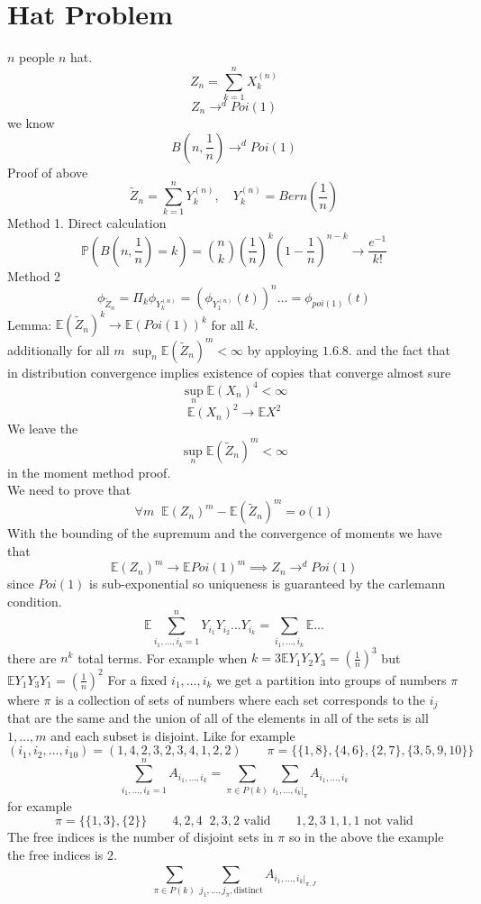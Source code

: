 \documentclass[11pt]{article}
\begin{document}
\section{Hat Problem}
$n$ people $n$ hat. 
\[
Z_n = \sum_{k=1}^{n} X_k^{(n)}
\] 
\[
Z_n \rightarrow^{d} Poi(1)
\] 
we know
\[
B(n, \frac{1}{n}) \rightarrow^{d} Poi(1)
\] 
Proof of above
\[
\tilde Z_n = \sum_{k=1}^{n} Y_k^{(n)} , \quad Y_k^{(n)} = Bern(\frac{1}{n})
\] 
Method 1. Direct calculation
\[
\mathbb{P}(B(n,\frac{1}{n}) = k) = \binom{n}{k} (\frac{1}{n})^{k}(1-\frac{1}{n})^{n-k} \rightarrow \frac{e^{-1}}{k!}
\] 
Method 2
\[
    \phi_{\tilde Z_n} = \Pi_k \phi_{Y_k^{(n)}} = (\phi_{Y_1^{(n)}}(t))^{n} \dots = \phi_{poi(1)}(t)
\] 
Lemma: $ \mathbb{E}(\tilde Z_n)^{k} \rightarrow \mathbb{E}(Poi(1))^{k}$ for all $k$.\\
additionally for all $m$  $\sup_n \mathbb{E}(\tilde Z_n)^{m} < \infty$ by apploying $1.6.8$. and the fact that in distribution convergence implies existence of copies that converge almost sure
\[
\sup_n \mathbb{E}(X_n)^{4} < \infty
\] 
\[
 \mathbb{E}(X_n)^2 \rightarrow \mathbb{E} X^2
\] 
We leave the 
\[
\sup_n \mathbb{E}( \tilde Z_n)^{m} < \infty
\] 
in the moment method proof.\\
We need to prove that 
\[
\forall m \;\; \mathbb{E}(Z_n)^{m} - \mathbb{E}(\tilde Z_n)^{m} = o(1)
\] 
With the bounding of the supremum and the convergence of moments we have that
\[
\mathbb{E}(Z_n)^{m} \rightarrow \mathbb{E} Poi(1)^{m} \implies Z_n \rightarrow^{d} Poi(1)
\] 
since $Poi(1)$ is sub-exponential so uniqueness is guaranteed by the carlemann condition.
 \[
     \mathbb{E}\sum_{i_1,\dots,i_k = 1}^{n} Y_{i_1} Y_{i_2}\dots Y_{i_k} = \sum_{i_1,\dots,i_k}^{} \mathbb{E} \dots
\] 
there are $n^{k}$ total terms. For example when $k = 3 \mathbb{E}Y_1Y_2Y_3 = (\frac{1}{n})^{3}$ but $ \mathbb{E}Y_1Y_3Y_1 = (\frac{1}{n})^{2}$ 
For a fixed $i_1,\dots,i_k$ we get a partition into groups of numbers $\pi$ where $\pi$ is a collection of sets of numbers where each set corresponds to the $i_j$ that are the same and the union of all of the elements in all of the sets is all  $1,\dots,m$ and each subset is disjoint.
Like for example
 \[
     (i_1,i_2,\dots,i_{10}) = (1,4,2,3,2,3,4,1,2,2) \qquad \pi = \{\{1,8\},\{4,6\},\{2,7\},\{3,5,9,10\}\}
\] 
\[
    \sum_{i_1,\dots,i_k=1}^{n} A_{i_1,\dots,i_k} = \sum_{\pi \in P(k)}^{} \sum_{i_1,\dots,i_k|_{\pi}}^{}A_{i_1,\dots,i_k}
\] 
for example
\[
    \pi = \{\{1,3\},\{2\}\} \qquad 4,2,4 \;\; 2,3,2 \text{ valid} \qquad 1,2,3 \; 1,1,1 \text{ not valid}
\] 
The free indices is the number of disjoint sets in $ \pi$ so in the above the example the free indices is $2$.
\[
    \sum_{\pi \in P(k)}^{}\sum_{j_1,\dots,j_\pi, \text{distinct}}^{} A_{i_1,\dots,i_k|_{\pi,J}}
\] 
\end{document}
